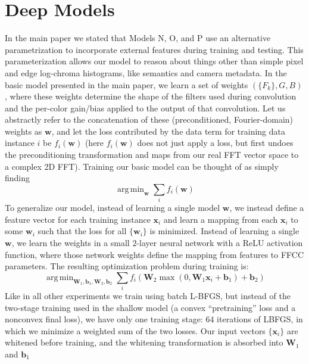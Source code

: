 \documentclass[10pt,twocolumn,letterpaper]{article}
\DeclareMathOperator*{\argmin}{arg\,min}
\begin{document}
\section{Deep Models}

In the main paper we stated that Models N, O, and P use an alternative parametrization
to incorporate external features during training and testing.
%
This parameterization allows our model to reason about things other than
simple pixel and edge log-chroma histograms, like semantics and camera metadata.
%
In the basic model presented in the main paper, we learn a set of weights
$( \{F_k \}, G, B )$, where these weights determine the shape of the filters
used during convolution and the per-color gain/bias applied to the output of
that convolution.
%
Let us abstractly refer to the concatenation of these (preconditioned,
Fourier-domain) weights as $\mathbf{w}$, and let the loss contributed by the data term
for training data instance $i$ be $f_i(\mathbf{w})$
(here $f_i(\mathbf{w})$ does not just apply a loss, but first undoes the
preconditioning transformation and maps from our real FFT vector space to a
complex 2D FFT).
%
Training our basic model can be thought of as simply finding
\begin{equation}
\argmin_{\mathbf{w}} \sum_i f_i \left( \mathbf{w} \right)
\end{equation}
%
To generalize our model, instead of learning a single model $\mathbf{w}$, we
instead define a feature vector for each training instance $\mathbf{x}_i$
and learn a mapping from each $\mathbf{x}_i$ to some $\mathbf{w}_i$ such that
the loss for all $\{ \mathbf{w}_i \}$ is minimized.
%
Instead of learning a single $\mathbf{w}$, we learn the weights in a small
$2$-layer neural network with a ReLU activation function, where those
network weights define the mapping from features to FFCC parameters.
%
The resulting optimization problem during training is:
\begin{equation}
\argmin_{\mathbf{W}_1, \mathbf{b}_1, \mathbf{W}_2, \mathbf{b}_2} \sum_i f_i \left( \mathbf{W}_2 \max(0, \mathbf{W}_1 \mathbf{x}_i + \mathbf{b}_1) + \mathbf{b}_2 \right)
\end{equation}
Like in all other experiments we train using batch L-BFGS, but instead of the
two-stage training used in the shallow model (a convex ``pretraining''
loss and a nonconvex final loss), we have only one training stage:
$64$ iterations of LBFGS, in which we minimize a weighted sum of the two losses.
%
Our input vectors $\{ \mathbf{x}_i \}$ are whitened before training, and
the whitening transformation is absorbed into $\mathbf{W}_1$ and $\mathbf{b}_1$
\end{document}
